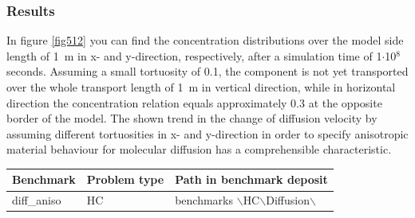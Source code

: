 \subsubsection*{Results}

In figure \ref{fig512} you can find the concentration distributions over the model side length of 1~m in x- and y-direction, respectively, after a simulation time of 1$\cdot$10$^8$ seconds. Assuming a small tortuosity of 0.1, the component is not yet transported over the whole transport length of 1~m in vertical direction, while in horizontal direction the concentration relation equals approximately 0.3 at the opposite border of the model. The shown trend in the change of diffusion velocity by assuming different tortuosities in x- and y-direction in order to specify anisotropic material behaviour for molecular diffusion has a comprehensible characteristic.

\begin{tabular}{|l|l|l|}
\hline
Benchmark & Problem type	& Path in benchmark deposit \\
\hline	
diff\_aniso	& HC	& benchmarks $\backslash$HC$\backslash$Diffusion$\backslash$ \\
\hline	
\end{tabular}
